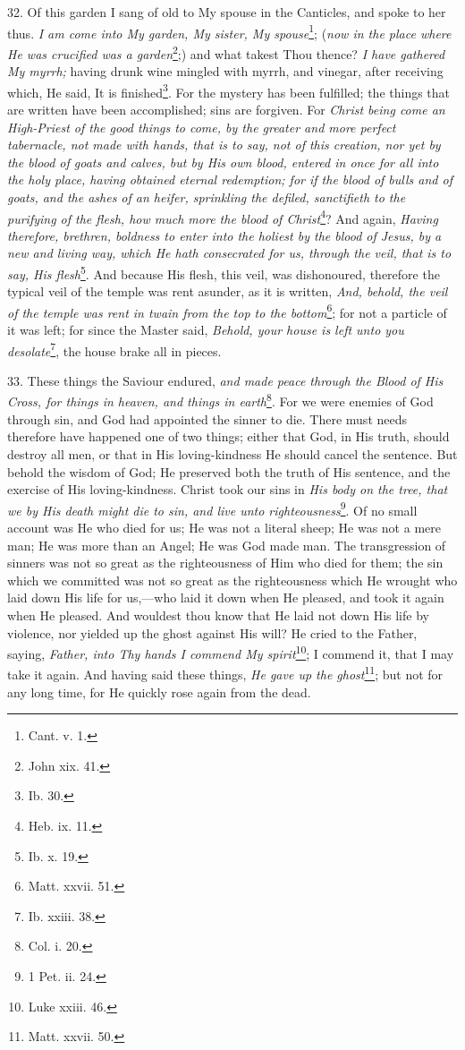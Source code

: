 32. Of this garden I sang of old to My spouse in the Canticles, and spoke to her thus. \emph{I am come into My garden, My sister, My spouse}\footnote{Cant. v. 1.}; (\emph{now in the place where He was crucified was a garden}\footnote{John xix. 41.};) and what takest Thou thence? \emph{I have gathered My myrrh;} having drunk wine mingled with myrrh, and vinegar, after receiving which, He said, It is finished\footnote{Ib. 30.}. For the mystery has been fulfilled; the things that are written have been accomplished; sins are forgiven. For \emph{Christ being come an High-Priest of the good things to come, by the greater and more perfect tabernacle, not made with hands, that is to say, not of this creation, nor yet by the blood of goats and calves, but by His own blood, entered in once for all into the holy place, having obtained eternal redemption; for if the blood of bulls and of goats, and the ashes of an heifer, sprinkling the defiled, sanctifieth to the purifying of the flesh, how much more the blood of Christ}\footnote{Heb. ix. 11.}? And again, \emph{Having therefore, brethren, boldness to enter into the holiest by the blood of Jesus, by a new and living way, which He hath consecrated for us, through the veil, that is to say, His flesh}\footnote{Ib. x. 19.}. And because His flesh, this veil, was dishonoured, therefore the typical veil of the temple was rent asunder, as it is written, \emph{And, behold, the veil of the temple was rent in twain from the top to the bottom}\footnote{Matt. xxvii. 51.}; for not a particle of it was left; for since the Master said, \emph{Behold, your house is left unto you desolate}\footnote{Ib. xxiii. 38.}, the house brake all in pieces.

33. These things the Saviour endured, \emph{and made peace through the Blood of His Cross, for things in heaven, and things in earth}\footnote{Col. i. 20.}. For we were enemies of God through sin, and God had appointed the sinner to die. There must needs therefore have happened one of two things; either that God, in His truth, should destroy all men, or that in His loving-kindness He should cancel the sentence. But behold the wisdom of God; He preserved both the truth of His sentence, and the exercise of His loving-kindness. Christ took our sins in \emph{His body on the tree, that we by His death might die to sin, and live unto righteousness}\footnote{1 Pet. ii. 24.}. Of no small account was He who died for us; He was not a literal sheep; He was not a mere man; He was more than an Angel; He was God made man. The transgression of sinners was not so great as the righteousness of Him who died for them; the sin which we committed was not so great as the righteousness which He wrought who laid down His life for us,—who laid it down when He pleased, and took it again when He pleased. And wouldest thou know that He laid not down His life by violence, nor yielded up the ghost against His will? He cried to the Father, saying, \emph{Father, into Thy hands I commend My spirit}\footnote{Luke xxiii. 46.}; I commend it, that I may take it again. And having said these things, \emph{He gave up the ghost}\footnote{Matt. xxvii. 50.}; but not for any long time, for He quickly rose again from the dead.

